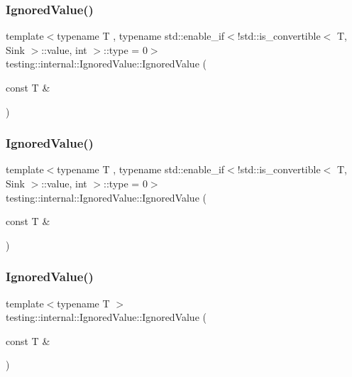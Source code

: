 \subsubsection{\texorpdfstring{IgnoredValue()}{IgnoredValue()}\hspace{0.1cm}{\footnotesize\ttfamily [1/3]}}
{\footnotesize\ttfamily template$<$typename T , typename std\+::enable\+\_\+if$<$!std\+::is\+\_\+convertible$<$ T, Sink $>$\+::value, int $>$\+::type  = 0$>$ \\
testing\+::internal\+::\+Ignored\+Value\+::\+Ignored\+Value (\begin{DoxyParamCaption}\item[{const T \&}]{ }\end{DoxyParamCaption})\hspace{0.3cm}{\ttfamily [inline]}}

\mbox{\label{classtesting_1_1internal_1_1_ignored_value_a851d14f6c0f584d5c5a49ddbc06d6538}} 
\subsubsection{\texorpdfstring{IgnoredValue()}{IgnoredValue()}\hspace{0.1cm}{\footnotesize\ttfamily [2/3]}}
{\footnotesize\ttfamily template$<$typename T , typename std\+::enable\+\_\+if$<$!std\+::is\+\_\+convertible$<$ T, Sink $>$\+::value, int $>$\+::type  = 0$>$ \\
testing\+::internal\+::\+Ignored\+Value\+::\+Ignored\+Value (\begin{DoxyParamCaption}\item[{const T \&}]{ }\end{DoxyParamCaption})\hspace{0.3cm}{\ttfamily [inline]}}

\mbox{\label{classtesting_1_1internal_1_1_ignored_value_a6c72839c07a9da8d027efb253144bd91}} 
\subsubsection{\texorpdfstring{IgnoredValue()}{IgnoredValue()}\hspace{0.1cm}{\footnotesize\ttfamily [3/3]}}
{\footnotesize\ttfamily template$<$typename T $>$ \\
testing\+::internal\+::\+Ignored\+Value\+::\+Ignored\+Value (\begin{DoxyParamCaption}\item[{const T \&}]{ }\end{DoxyParamCaption})\hspace{0.3cm}{\ttfamily [inline]}}



